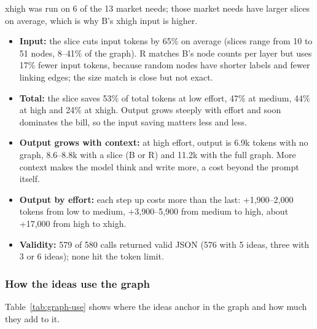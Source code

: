 xhigh was run on 6 of the 13 market needs; those market needs have larger slices on average, which is why B's xhigh input is higher.

\begin{itemize}
\tightlist
\item
  \textbf{Input:} the slice cuts input tokens by 65\% on average (slices range from 10 to 51 nodes, 8--41\% of the graph). R matches B's node counts per layer but uses 17\% fewer input tokens, because random nodes have shorter labels and fewer linking edges; the size match is close but not exact.
\item
  \textbf{Total:} the slice saves 53\% of total tokens at low effort, 47\% at medium, 44\% at high and 24\% at xhigh. Output grows steeply with effort and soon dominates the bill, so the input saving matters less and less.
\item
  \textbf{Output grows with context:} at high effort, output is 6.9k tokens with no graph, 8.6--8.8k with a slice (B or R) and 11.2k with the full graph. More context makes the model think and write more, a cost beyond the prompt itself.
\item
  \textbf{Output by effort:} each step up costs more than the last: +1,900--2,000 tokens from low to medium, +3,900--5,900 from medium to high, about +17,000 from high to xhigh.
\item
  \textbf{Validity:} 579 of 580 calls returned valid JSON (576 with 5 ideas, three with 3 or 6 ideas); none hit the token limit.
\end{itemize}

\hypertarget{how-the-ideas-use-the-graph}{%
\subsubsection{How the ideas use the graph}\label{how-the-ideas-use-the-graph}}

Table~\ref{tab:graph-use} shows where the ideas anchor in the graph and how much they add to it.

